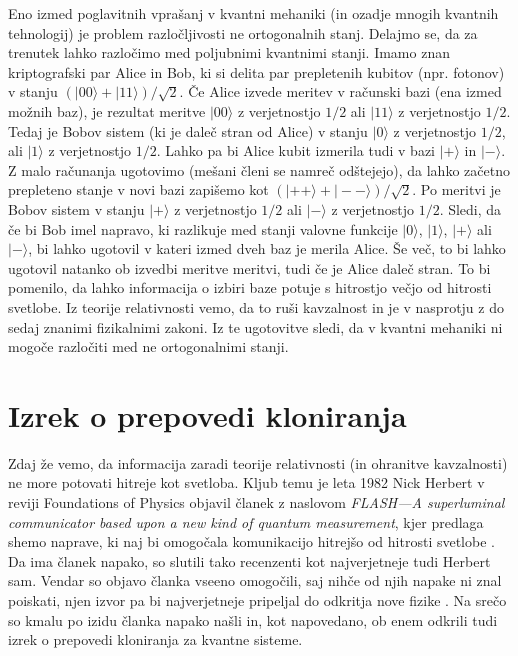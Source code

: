 \documentclass[12pt]{article}
\begin{document}
Eno izmed poglavitnih vprašanj v kvantni mehaniki (in ozadje mnogih kvantnih tehnologij) je problem razločljivosti ne ortogonalnih stanj. Delajmo se, da za trenutek lahko razločimo med poljubnimi kvantnimi stanji. Imamo znan kriptografski par Alice in Bob, ki si delita par prepletenih kubitov (npr. fotonov) v stanju $ ( | 00 \rangle + | 11 \rangle ) / \sqrt{2}$. Če Alice izvede meritev v računski bazi (ena izmed možnih baz), je rezultat meritve $| 00 \rangle$ z verjetnostjo $1/2$ ali $| 11 \rangle$ z verjetnostjo $1/2$. Tedaj je Bobov sistem (ki je daleč stran od Alice) v stanju $| 0 \rangle $ z verjetnostjo $1/2$, ali $| 1 \rangle $ z verjetnostjo $1/2$. Lahko pa bi Alice kubit izmerila tudi v bazi $| + \rangle$ in $| - \rangle$. Z malo računanja ugotovimo (mešani členi se namreč odštejejo), da lahko začetno prepleteno stanje v novi bazi zapišemo kot $ ( | ++ \rangle + | -- \rangle ) / \sqrt{2} $. Po meritvi je Bobov sistem   v stanju $| + \rangle $ z verjetnostjo $1/2$ ali $| - \rangle $ z verjetnostjo $1/2$. Sledi, da če bi Bob imel napravo, ki razlikuje med stanji valovne funkcije  $| 0 \rangle$, $| 1 \rangle$, $|+ \rangle$ ali $| - \rangle$, bi lahko ugotovil v kateri izmed dveh baz je merila Alice. Še več, to bi lahko ugotovil natanko ob izvedbi meritve meritvi, tudi če je Alice daleč stran. To bi pomenilo, da lahko informacija o izbiri baze potuje s hitrostjo večjo od hitrosti svetlobe. Iz teorije relativnosti vemo, da to ruši kavzalnost in je v nasprotju z do sedaj znanimi fizikalnimi zakoni. Iz te ugotovitve sledi, da v kvantni mehaniki ni mogoče razločiti med ne ortogonalnimi stanji. \cite{nielsenQuantumComputationQuantum2012}  
 
 \section{Izrek o prepovedi kloniranja}
   Zdaj že vemo, da informacija zaradi teorije relativnosti (in ohranitve kavzalnosti) ne more potovati hitreje kot svetloba. Kljub temu je leta 1982 Nick Herbert v reviji Foundations of Physics objavil članek z naslovom \emph{FLASH—A superluminal communicator based upon a new kind of quantum measurement}, kjer predlaga shemo naprave, ki naj bi omogočala komunikacijo hitrejšo od hitrosti svetlobe \cite{herbertFLASHSuperluminalCommunicator1982}. Da ima članek napako, so slutili tako recenzenti kot najverjetneje tudi Herbert sam. Vendar so objavo članka vseeno omogočili, saj nihče od njih napake ni znal poiskati, njen izvor pa bi najverjetneje pripeljal do odkritja nove fizike \cite{peresHowNocloningTheorem2003}. Na srečo so kmalu po izidu članka napako našli \cite{woottersSingleQuantumCannot1982} in, kot napovedano, ob enem odkrili tudi izrek o prepovedi kloniranja za kvantne sisteme.
\end{document}
